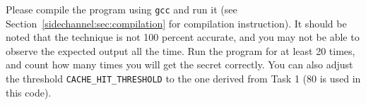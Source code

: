 Please compile the program using \texttt{gcc} and run it (see Section~\ref{sidechannel:sec:compilation}
for compilation instruction).
It should be noted that the technique is not 100 percent accurate, and you may not 
be able to observe the expected output all the time. 
Run the program for at least 20 times, and count how many times 
you will get the secret correctly. You can also adjust the 
threshold \texttt{CACHE\_HIT\_THRESHOLD} to the one derived from
Task 1 (80 is used in this code). 


